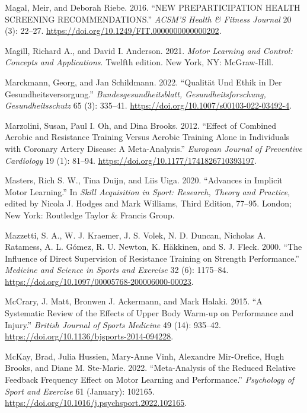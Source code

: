 \documentclass[
  letterpaper,
  DIV=11,
  numbers=noendperiod]{scrreprt}
\newlength{\cslhangindent}
\newenvironment{CSLReferences}[2] %
 {\begin{list}{}{%
  \setlength{\itemindent}{0pt}
  \setlength{\leftmargin}{0pt}
  \setlength{\parsep}{0pt}
  \ifodd #1
   \setlength{\leftmargin}{\cslhangindent}
   \setlength{\itemindent}{-1\cslhangindent}
  \fi
  \setlength{\itemsep}{#2\baselineskip}}}
 {\end{list}}
\begin{document}
\begin{CSLReferences}{1}{0}
Magal, Meir, and Deborah Riebe. 2016. {``{NEW PREPARTICIPATION HEALTH
SCREENING RECOMMENDATIONS}.''} \emph{ACSM'S Health \& Fitness Journal}
20 (3): 22--27. \url{https://doi.org/10.1249/FIT.0000000000000202}.

Magill, Richard A., and David I. Anderson. 2021. \emph{Motor Learning
and Control: {Concepts} and Applications}. Twelfth edition. New York,
NY: McGraw-Hill.

Marckmann, Georg, and Jan Schildmann. 2022. {``Qualit{ä}t Und {Ethik} in
Der {Gesundheitsversorgung}.''} \emph{Bundesgesundheitsblatt,
Gesundheitsforschung, Gesundheitsschutz} 65 (3): 335--41.
\url{https://doi.org/10.1007/s00103-022-03492-4}.

Marzolini, Susan, Paul I. Oh, and Dina Brooks. 2012. {``Effect of
Combined Aerobic and Resistance Training Versus Aerobic Training Alone
in Individuals with Coronary Artery Disease: A Meta-Analysis.''}
\emph{European Journal of Preventive Cardiology} 19 (1): 81--94.
\url{https://doi.org/10.1177/1741826710393197}.

Masters, Rich S. W., Tina Duijn, and Liis Uiga. 2020. {``Advances in
Implicit Motor Learning.''} In \emph{Skill Acquisition in Sport:
{Research}, Theory and Practice}, edited by Nicola J. Hodges and Mark
Williams, Third Edition, 77--95. London; New York: Routledge Taylor \&
Francis Group.

Mazzetti, S. A., W. J. Kraemer, J. S. Volek, N. D. Duncan, Nicholas A.
Ratamess, A. L. Gómez, R. U. Newton, K. Häkkinen, and S. J. Fleck. 2000.
{``The Influence of Direct Supervision of Resistance Training on
Strength Performance.''} \emph{Medicine and Science in Sports and
Exercise} 32 (6): 1175--84.
\url{https://doi.org/10.1097/00005768-200006000-00023}.

McCrary, J. Matt, Bronwen J. Ackermann, and Mark Halaki. 2015. {``A
Systematic Review of the Effects of Upper Body Warm-up on Performance
and Injury.''} \emph{British Journal of Sports Medicine} 49 (14):
935--42. \url{https://doi.org/10.1136/bjsports-2014-094228}.

McKay, Brad, Julia Hussien, Mary-Anne Vinh, Alexandre Mir-Orefice, Hugh
Brooks, and Diane M. Ste-Marie. 2022. {``Meta-Analysis of the Reduced
Relative Feedback Frequency Effect on Motor Learning and Performance.''}
\emph{Psychology of Sport and Exercise} 61 (January): 102165.
\url{https://doi.org/10.1016/j.psychsport.2022.102165}.


\end{CSLReferences}
\end{document}
